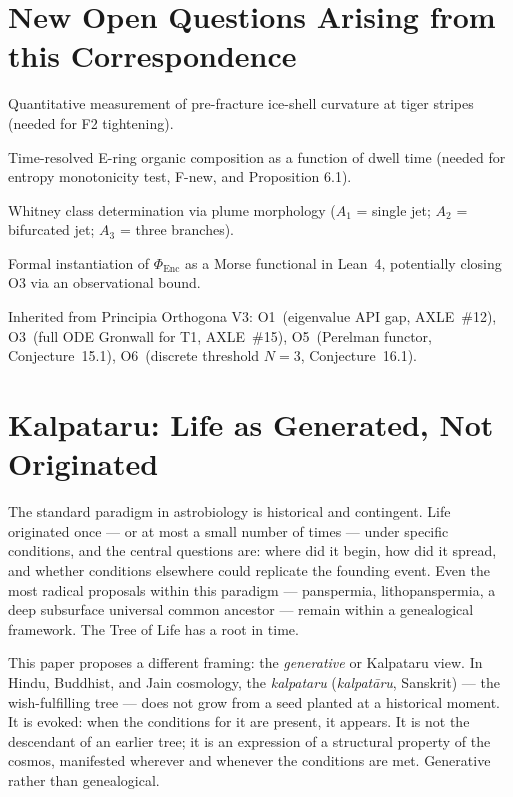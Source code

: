 \documentclass[12pt]{article}
\numberwithin{equation}{section}
\theoremstyle{remark}
\begin{document}
\section{New Open Questions Arising from this Correspondence}

\begin{description}[leftmargin=*]
\item[OE-1.] Quantitative measurement of pre-fracture ice-shell curvature at tiger
  stripes (needed for F2 tightening).
\item[OE-2.] Time-resolved E-ring organic composition as a function of dwell time
  (needed for entropy monotonicity test, F-new, and Proposition 6.1).
\item[OE-3.] Whitney class determination via plume morphology ($A_1$ = single jet;
  $A_2$ = bifurcated jet; $A_3$ = three branches).
\item[OE-4.] Formal instantiation of $\Phi_{\mathrm{Enc}}$ as a Morse functional
  in Lean~4, potentially closing O3 via an observational bound.
\end{description}

Inherited from Principia Orthogona V3: O1~(eigenvalue API gap, AXLE~\#12),
O3~(full ODE Gronwall for T1, AXLE~\#15), O5~(Perelman functor, Conjecture~15.1),
O6~(discrete threshold $N=3$, Conjecture~16.1).

\section{Kalpataru: Life as Generated, Not Originated}

The standard paradigm in astrobiology is historical and contingent. Life
originated once --- or at most a small number of times --- under specific conditions,
and the central questions are: where did it begin, how did it spread, and
whether conditions elsewhere could replicate the founding event. Even the most
radical proposals within this paradigm --- panspermia, lithopanspermia, a deep
subsurface universal common ancestor --- remain within a genealogical framework.
The Tree of Life has a root in time.

This paper proposes a different framing: the \emph{generative} or Kalpataru view.
In Hindu, Buddhist, and Jain cosmology, the \emph{kalpataru}
(\textit{kalpat\={a}ru}, Sanskrit) ---
the wish-fulfilling tree --- does not grow from a seed planted at a historical
moment. It is evoked: when the conditions for it are present, it appears.
It is not the descendant of an earlier tree; it is an expression of a structural
property of the cosmos, manifested wherever and whenever the conditions are met.
Generative rather than genealogical.
\end{document}
